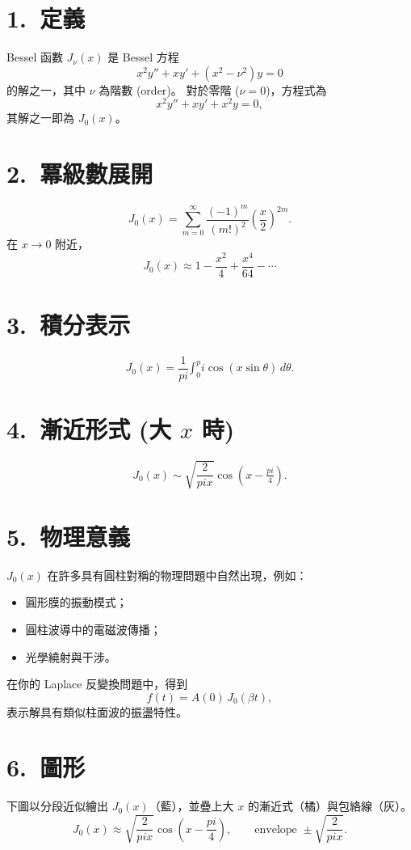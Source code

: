 \documentclass{article}
\def\pi{pi}%
\def\int{\text{∫}}%
\begin{document}
\section*{1.~定義}
Bessel 函數 $J_\nu(x)$ 是 Bessel 方程
\[
x^2 y'' + x y' + (x^2 - \nu^2)y = 0
\]
的解之一，其中 $\nu$ 為階數 (order)。  
對於零階 ($\nu=0$)，方程式為
\[
x^2 y'' + x y' + x^2 y = 0,
\]
其解之一即為 $J_0(x)$。

\section*{2.~冪級數展開}
\[
J_0(x) = \sum_{m=0}^{\infty} \frac{(-1)^m}{(m!)^2}\left(\frac{x}{2}\right)^{2m}.
\]
在 $x\to 0$ 附近，
\[
J_0(x) \approx 1 - \frac{x^2}{4} + \frac{x^4}{64} - \cdots
\]

\section*{3.~積分表示}
\[
J_0(x) = \frac{1}{\pi}\int_0^\pi \cos(x \sin\theta)\,d\theta.
\]

\section*{4.~漸近形式 (大 $x$ 時)}
\[
J_0(x) \sim \sqrt{\frac{2}{\pi x}}\cos\!\left(x - \tfrac{\pi}{4}\right).
\]

\section*{5.~物理意義}
$J_0(x)$ 在許多具有圓柱對稱的物理問題中自然出現，例如：
\begin{itemize}
  \item 圓形膜的振動模式；
  \item 圓柱波導中的電磁波傳播；
  \item 光學繞射與干涉。
\end{itemize}

在你的 Laplace 反變換問題中，得到
\[
f(t) = A(0)\,J_0(\beta t),
\]
表示解具有類似柱面波的振盪特性。

\vspace{1cm}
\section*{6.~圖形}

\noindent
下圖以分段近似繪出 $J_0(x)$（藍），並疊上大 $x$ 的漸近式（橘）與包絡線（灰）。
\[
J_0(x)\approx \sqrt{\frac{2}{\pi x}}\cos\!\left(x-\frac{\pi}{4}\right),\qquad
\text{envelope } \pm \sqrt{\frac{2}{\pi x}}.
\]
\end{document}
